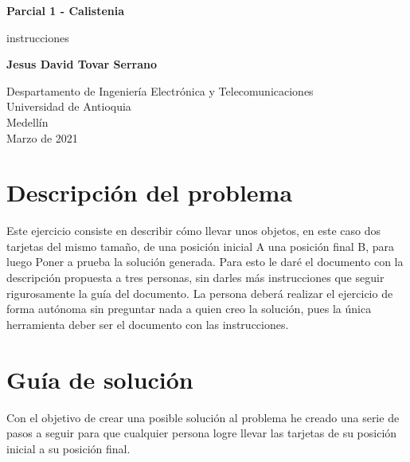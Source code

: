 \documentclass{article}
\begin{document}
\begin{titlepage}
    \begin{center}
        \vspace*{1cm}
            
        \Huge
        \textbf{Parcial 1 - Calistenia}
            
        \vspace{0.5cm}
        \LARGE
        instrucciones
            
        \vspace{1.5cm}
            
        \textbf{Jesus David Tovar Serrano}
            
        \vfill
            
        \vspace{0.8cm}
            
        \Large
        Despartamento de Ingeniería Electrónica y Telecomunicaciones\\
        Universidad de Antioquia\\
        Medellín\\
        Marzo de 2021
            
    \end{center}
\end{titlepage}

\tableofcontents
\newpage
\section{Descripción del problema}\label{intro}
Este ejercicio consiste en describir cómo llevar unos objetos, en este caso dos tarjetas del mismo tamaño, de una posición inicial A una posición final B, para luego Poner a prueba la solución generada. Para esto le daré el documento con la descripción propuesta a tres personas, sin darles más instrucciones que seguir rigurosamente la guía del documento. La persona deberá realizar el ejercicio de forma autónoma sin preguntar nada a quien creo la solución, pues la única herramienta deber ser el documento con las instrucciones.

\section{Guía de solución} \label{contenido}
Con el objetivo de crear una posible solución al problema he creado una serie de pasos a seguir para que cualquier persona logre llevar las tarjetas de su posición inicial a su posición final.
\end{document}
